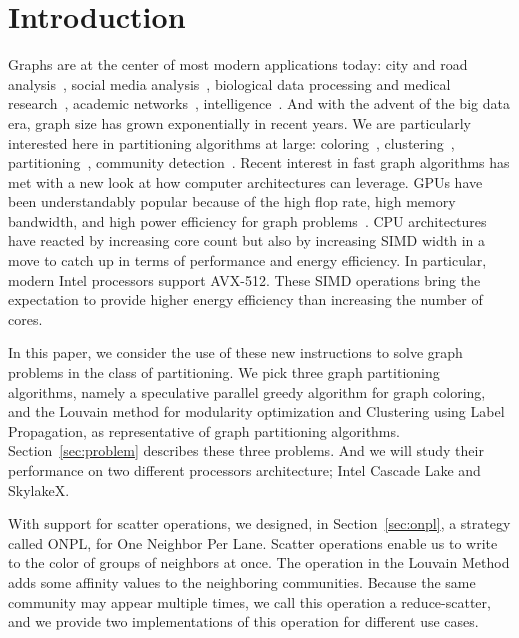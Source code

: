 \documentclass[default,iicol]{sn-jnl}%
\theoremstyle{thmstyleone}%
\theoremstyle{thmstyletwo}%
\theoremstyle{thmstylethree}%
\begin{document}

\section{Introduction}
Graphs are at the center of most modern applications today: city and road analysis~\cite{Porta09}, 
social media analysis~\cite{raghavan2007near, application1, girvan2002community}, biological data processing and medical
research~\cite{application2, girvan2002community}, academic networks~\cite{application4}, 
intelligence~\cite{Krebs02}. And with the advent of the big data era, graph size has grown exponentially in recent years. We
are particularly interested here in partitioning algorithms at large:
coloring~\cite{deveci2016parallel,matula1972graph,lewandowski1995practical}, 
clustering~\cite{application3}, partitioning~\cite{Karypis99}, community detection~\cite{Vincent,raghavan2007near}.
Recent interest in fast graph algorithms has met with a new look at how computer architectures can leverage. 
GPUs have been understandably popular because of the high flop rate, high memory bandwidth, and high power 
efficiency for graph problems~\cite{Cheong13}. CPU architectures have reacted by increasing core count 
but also by increasing SIMD width in a move to catch up in terms of performance and energy efficiency. 
In particular, modern Intel processors support AVX-512. These SIMD operations bring the expectation to provide higher 
energy efficiency than increasing the number of cores.


In this paper, we consider the use of these new instructions to solve graph problems in the class of partitioning. 
We pick three graph partitioning algorithms, namely a speculative parallel 
greedy algorithm for graph coloring, and the Louvain method for modularity optimization and Clustering using 
Label Propagation, as representative of graph partitioning algorithms. Section~\ref{sec:problem} describes these three 
problems. And we will study their performance on two different processors architecture; Intel Cascade Lake and SkylakeX.

With support for scatter operations, we designed, in
Section~\ref{sec:onpl}, a strategy called ONPL, for One Neighbor Per
Lane. Scatter operations enable us to write to the color of groups of
neighbors at once. The operation in the Louvain Method adds some
affinity values to the neighboring communities. Because the same
community may appear multiple times, we call this operation a
reduce-scatter, and we provide two implementations of this operation
for different use cases.
\end{document}
